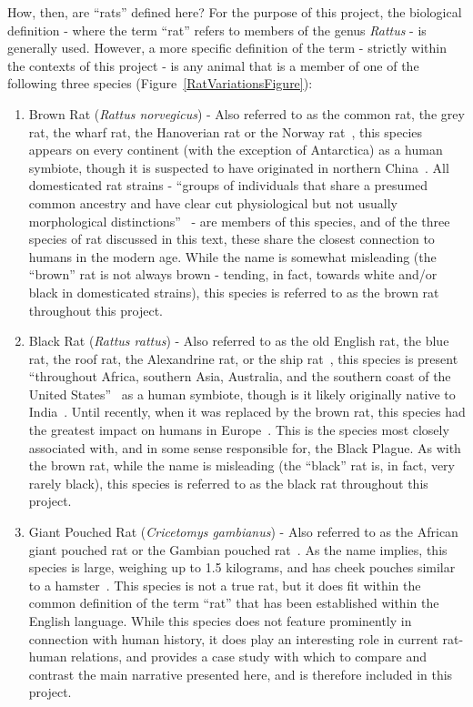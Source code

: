 \documentclass[12pt]{article}
\begin{document}
How, then, are ``rats'' defined here? For the purpose of this project, the biological definition - where the term ``rat'' refers to members of the genus \textit{Rattus} - is generally used. However, a more specific definition of the term - strictly within the contexts of this project - is any animal that is a member of one of the following three species (Figure~\ref{RatVariationsFigure}):
\begin{enumerate}
\item Brown Rat (\textit{Rattus norvegicus}) - Also referred to as the common rat, the grey rat, the wharf rat, the Hanoverian rat or the Norway rat~\cite{Barnett1975, Barnett2001}, this species appears on every continent (with the exception of Antarctica) as a human symbiote, though it is suspected to have originated in northern China~\cite{WalkerRattus1999}. All domesticated rat strains - ``groups of individuals that share a presumed common ancestry and have clear cut physiological but not usually morphological distinctions''~\cite{Hanson2012} - are members of this species, and of the three species of rat discussed in this text, these share the closest connection to humans in the modern age. While the name is somewhat misleading (the ``brown'' rat is not always brown - tending, in fact, towards white and/or black in domesticated strains), this species is referred to as the brown rat throughout this project.
\item Black Rat (\textit{Rattus rattus}) - Also referred to as the old English rat, the blue rat, the roof rat, the Alexandrine rat, or the ship rat~\cite{Barnett1975, Barnett2001}, this species is present ``throughout Africa, southern Asia, Australia, and the southern coast of the United States''~\cite{ONeill} as a human symbiote, though is it likely originally native to India~\cite{WalkerRattus1999}. Until recently, when it was replaced by the brown rat, this species had the greatest impact on humans in Europe~\cite{Barnett2001}. This is the species most closely associated with, and in some sense responsible for, the Black Plague. As with the brown rat, while the name is misleading (the ``black'' rat is, in fact, very rarely black), this species is referred to as the black rat throughout this project.
\item Giant Pouched Rat (\textit{Cricetomys gambianus}) - Also referred to as the African giant pouched rat or the Gambian pouched rat~\cite{APOPO}. As the name implies, this species is large, weighing up to 1.5 kilograms, and has cheek pouches similar to a hamster~\cite{APOPO, WalkerCricetomys1999}. This species is not a true rat, but it does fit within the common definition of the term ``rat'' that has been established within the English language. While this species does not feature prominently in connection with human history, it does play an interesting role in current rat-human relations, and provides a case study with which to compare and contrast the main narrative presented here, and is therefore included in this project.
\end{enumerate}
\end{document}
